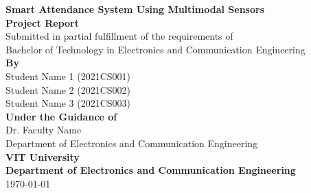 \documentclass[12pt,a4paper]{article}
\begin{document}
\begin{titlepage}
	\centering
	\vspace*{2cm}

	\LARGE\textbf{Smart Attendance System Using Multimodal Sensors}\\[1cm]

	\Large\textbf{Project Report}\\[0.5cm]

	\large{Submitted in partial fulfillment of the requirements of}\\[0.3cm]
	\large{Bachelor of Technology in Electronics and Communication Engineering}\\[2cm]

	\Large\textbf{By}\\[0.5cm]
	\large{Student Name 1 (2021CS001)}\\
	\large{Student Name 2 (2021CS002)}\\
	\large{Student Name 3 (2021CS003)}\\[2cm]

	\Large\textbf{Under the Guidance of}\\[0.5cm]
	\large{Dr. Faculty Name}\\
	\large{Department of Electronics and Communication Engineering}\\[2cm]

	\Large\textbf{VIT University}\\
	\Large\textbf{Department of Electronics and Communication Engineering}\\[1cm]
	\large{\today}

	\pagebreak
\end{titlepage}

\begin{abstract}
	Manual attendance tracking in educational institutions is time-consuming, prone to errors, and lacks real-time monitoring capabilities. This project presents a Smart Attendance System using multimodal sensors that automates the attendance process through RFID-based teacher authentication and AI-powered facial recognition for student identification. The system utilizes an ESP32 microcontroller equipped with an RC522 RFID module for teacher authentication and an ESP32-CAM module for capturing student faces. A Flask-based web server processes the captured images using the SCRFD-34GF face detection model and ArcFace recognition algorithm. When a teacher initiates a session by scanning their RFID card, a 15-minute attendance window begins, during which the camera captures student faces. The system identifies students using facial recognition and automatically marks their attendance. Upon session completion, an automated email report is sent to the teacher containing the attendance summary. The proposed system demonstrates 85\% recognition accuracy with an average processing time of 500ms per image, offering a reliable and efficient alternative to traditional attendance methods.

	\textbf{Keywords:} Attendance System, Face Recognition, RFID, ESP32, SCRFD, ArcFace, IoT, Multimodal Sensors
\end{abstract}
\pagebreak
\end{document}

